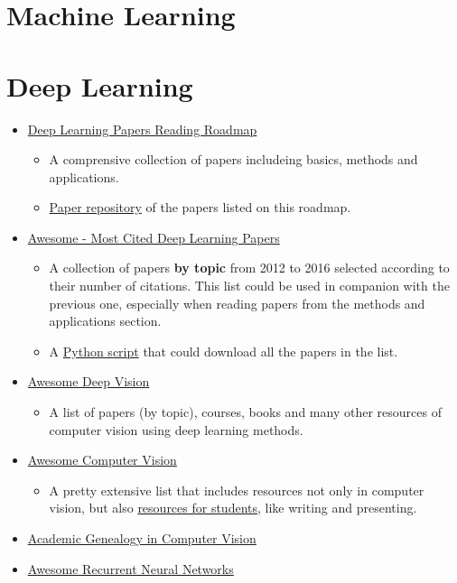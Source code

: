 \documentclass[11pt]{article}
\begin{document}
\section{Machine Learning}
\label{sec-4}

\section{Deep Learning}
\label{sec-5}
\begin{itemize}
\item \href{https://github.com/floodsung/Deep-Learning-Papers-Reading-Roadmap}{Deep Learning Papers Reading Roadmap}
\begin{itemize}
\item A comprensive collection of papers includeing basics, methods and applications.
\item \href{https://github.com/LuckyZXL2016/Deep-Learning-Papers-Reading-Roadmap}{Paper repository} of the papers listed on this roadmap.
\end{itemize}
\item \href{https://github.com/terryum/awesome-deep-learning-papers}{Awesome - Most Cited Deep Learning Papers}
\begin{itemize}
\item A collection of papers \textbf{by topic} from 2012 to 2016 selected
according to their number of citations. This list could be used in companion with the previous one, 
especially when reading papers from the methods and applications section.
\item A \href{https://github.com/terryum/awesome-deep-learning-papers/blob/master/fetch_papers.py}{Python script} that could download all the papers in the list.
\end{itemize}
\item \href{https://github.com/kjw0612/awesome-deep-vision}{Awesome Deep Vision}
\begin{itemize}
\item A list of papers (by topic), courses, books and many other resources of computer
vision using deep learning methods.
\end{itemize}
\item \href{https://github.com/jbhuang0604/awesome-computer-vision}{Awesome Computer Vision}
\begin{itemize}
\item A pretty extensive list that includes resources not only in computer vision, but also
\href{https://github.com/jbhuang0604/awesome-computer-vision#resources-for-students}{resources for students}, like writing and presenting.
\end{itemize}
\item \href{https://github.com/jbhuang0604/awesome-computer-vision/blob/master/people.md}{Academic Genealogy in Computer Vision}
\item \href{https://github.com/kjw0612/awesome-rnn}{Awesome Recurrent Neural Networks}
\end{itemize}
\end{document}
